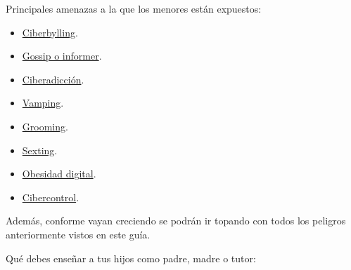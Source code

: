 \documentclass[
  spanish,
  a4paper,
  openany]{book}
\begin{document}
Principales amenazas a la que los menores están expuestos:

\begin{itemize}
\item
  \href{https://ayudaenaccion.org/ong/blog/educacion/ciberbullying/}{Ciberbylling}.
\item
  \href{https://educacion2.com/que-es-el-fenomeno-gossip-e-informer/}{Gossip o informer}.
\item
  \href{https://www.aepap.org/sites/default/files/pags._131-142_ciberadicciones.pdf}{Ciberadicción}.
\item
  \href{https://www.educapeques.com/escuela-de-padres/vamping-definicion.html}{Vamping}.
\item
  \href{https://www.savethechildren.es/actualidad/grooming-que-es-como-detectarlo-y-prevenirlo}{Grooming}.
\item
  \href{https://www.is4k.es/menores-y-sexting}{Sexting}.
\item
  \href{https://theconversation.com/la-obesidad-digital-amenaza-nuestro-bienestar-cambiemos-la-dieta-124607}{Obesidad digital}.
\item
  \href{https://www.incibe.es/menores/tematicas/cibercontrol}{Cibercontrol}.
\end{itemize}

Además, conforme vayan creciendo se podrán ir topando con todos los peligros anteriormente vistos en este guía.

Qué debes enseñar a tus hijos como padre, madre o tutor:
\end{document}
